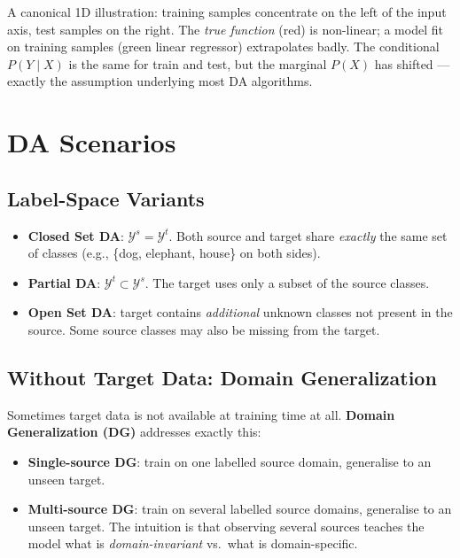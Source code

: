 \documentclass[11pt,a4paper]{article}
\theoremstyle{definition}
\theoremstyle{plain}
\theoremstyle{remark}
\begin{document}
A canonical 1D illustration: training samples concentrate on the left of the input axis, test samples on the right. The \emph{true function} (red) is non-linear; a model fit on training samples (green linear regressor) extrapolates badly. The conditional $P(Y\mid X)$ is the same for train and test, but the marginal $P(X)$ has shifted --- exactly the assumption underlying most DA algorithms.


\section{DA Scenarios}

\subsection{Label-Space Variants}

\begin{itemize}
    \item \textbf{Closed Set DA}: $\mathcal{Y}^s = \mathcal{Y}^t$. Both source and target share \emph{exactly} the same set of classes (e.g., \{dog, elephant, house\} on both sides).
    \item \textbf{Partial DA}: $\mathcal{Y}^t \subset \mathcal{Y}^s$. The target uses only a subset of the source classes.
    \item \textbf{Open Set DA}: target contains \emph{additional} unknown classes not present in the source. Some source classes may also be missing from the target.
\end{itemize}

\subsection{Without Target Data: Domain Generalization}

Sometimes target data is not available at training time at all. \textbf{Domain Generalization (DG)} addresses exactly this:

\begin{itemize}
    \item \textbf{Single-source DG}: train on one labelled source domain, generalise to an unseen target.
    \item \textbf{Multi-source DG}: train on several labelled source domains, generalise to an unseen target. The intuition is that observing several sources teaches the model what is \emph{domain-invariant} vs.\ what is domain-specific.
\end{itemize}
\end{document}
